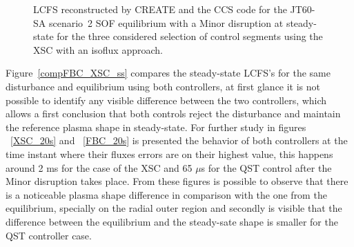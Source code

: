 \begin{figure}[h]
\caption{LCFS reconstructed by CREATE and the CCS code  for the JT60-SA scenario~2 SOF equilibrium with a Minor disruption at steady-state for the three considered selection of control segments using the XSC with an isoflux approach.}\label{all_points}

\end{figure}

Figure~\ref{compFBC_XSC_ss} compares the steady-state LCFS's for the same disturbance and equilibrium using both controllers, at first glance it is not possible to identify any visible difference between the two controllers, which allows a first conclusion that both controls reject the disturbance and maintain the reference plasma shape in steady-state. For further study in figures ~\ref{XSC_20s} and  ~\ref{FBC_20s} is presented the behavior of both controllers at the time instant where their fluxes errors are on their highest value, this happens around 2 ms for the case of the XSC and 65 $\mu$s for the QST control after the Minor disruption takes place. From these figures is possible to  observe that there is a noticeable plasma shape difference in comparison with the one from the equilibrium, specially   on the radial outer region and secondly is visible that the difference between the equilibrium and the steady-sate shape  is smaller for the QST controller case.     
\smallskip

